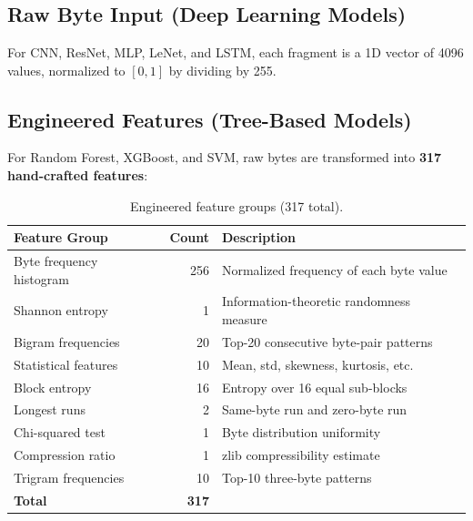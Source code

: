 \documentclass[12pt,a4paper]{report}
\begin{document}
\chapter{}
\begin{normalsize}
\noindent

\section{Raw Byte Input (Deep Learning Models)}
{\setlength{\baselineskip}{1.0\baselineskip}
For CNN, ResNet, MLP, LeNet, and LSTM, each fragment is a 1D vector of 4096 values, normalized to $[0, 1]$ by dividing by 255.
\par}

\section{Engineered Features (Tree-Based Models)}
{\setlength{\baselineskip}{1.0\baselineskip}
For Random Forest, XGBoost, and SVM, raw bytes are transformed into \textbf{317 hand-crafted features}:

\begin{table}[H]
\centering
\caption{Engineered feature groups (317 total).}
\label{tab:features}
\small
\begin{tabular}{lrl}
\toprule
\textbf{Feature Group} & \textbf{Count} & \textbf{Description} \\
\midrule
Byte frequency histogram & 256 & Normalized frequency of each byte value \\
Shannon entropy & 1 & Information-theoretic randomness measure \\
Bigram frequencies & 20 & Top-20 consecutive byte-pair patterns \\
Statistical features & 10 & Mean, std, skewness, kurtosis, etc. \\
Block entropy & 16 & Entropy over 16 equal sub-blocks \\
Longest runs & 2 & Same-byte run and zero-byte run \\
Chi-squared test & 1 & Byte distribution uniformity \\
Compression ratio & 1 & zlib compressibility estimate \\
Trigram frequencies & 10 & Top-10 three-byte patterns \\
\midrule
\textbf{Total} & \textbf{317} & \\
\bottomrule
\end{tabular}
\end{table}

}
\end{normalsize}
\end{document}
